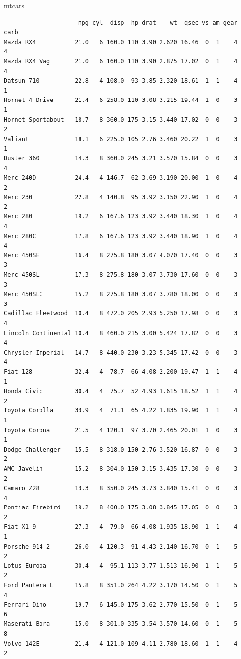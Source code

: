 \documentclass[
]{article}
\newenvironment{Shaded}{\begin{snugshade}}{\end{snugshade}}
\newcommand{\NormalTok}[1]{#1}
\begin{document}
\begin{Shaded}
\begin{Highlighting}[]
\NormalTok{mtcars}
\end{Highlighting}
\end{Shaded}

\begin{verbatim}
                     mpg cyl  disp  hp drat    wt  qsec vs am gear carb
Mazda RX4           21.0   6 160.0 110 3.90 2.620 16.46  0  1    4    4
Mazda RX4 Wag       21.0   6 160.0 110 3.90 2.875 17.02  0  1    4    4
Datsun 710          22.8   4 108.0  93 3.85 2.320 18.61  1  1    4    1
Hornet 4 Drive      21.4   6 258.0 110 3.08 3.215 19.44  1  0    3    1
Hornet Sportabout   18.7   8 360.0 175 3.15 3.440 17.02  0  0    3    2
Valiant             18.1   6 225.0 105 2.76 3.460 20.22  1  0    3    1
Duster 360          14.3   8 360.0 245 3.21 3.570 15.84  0  0    3    4
Merc 240D           24.4   4 146.7  62 3.69 3.190 20.00  1  0    4    2
Merc 230            22.8   4 140.8  95 3.92 3.150 22.90  1  0    4    2
Merc 280            19.2   6 167.6 123 3.92 3.440 18.30  1  0    4    4
Merc 280C           17.8   6 167.6 123 3.92 3.440 18.90  1  0    4    4
Merc 450SE          16.4   8 275.8 180 3.07 4.070 17.40  0  0    3    3
Merc 450SL          17.3   8 275.8 180 3.07 3.730 17.60  0  0    3    3
Merc 450SLC         15.2   8 275.8 180 3.07 3.780 18.00  0  0    3    3
Cadillac Fleetwood  10.4   8 472.0 205 2.93 5.250 17.98  0  0    3    4
Lincoln Continental 10.4   8 460.0 215 3.00 5.424 17.82  0  0    3    4
Chrysler Imperial   14.7   8 440.0 230 3.23 5.345 17.42  0  0    3    4
Fiat 128            32.4   4  78.7  66 4.08 2.200 19.47  1  1    4    1
Honda Civic         30.4   4  75.7  52 4.93 1.615 18.52  1  1    4    2
Toyota Corolla      33.9   4  71.1  65 4.22 1.835 19.90  1  1    4    1
Toyota Corona       21.5   4 120.1  97 3.70 2.465 20.01  1  0    3    1
Dodge Challenger    15.5   8 318.0 150 2.76 3.520 16.87  0  0    3    2
AMC Javelin         15.2   8 304.0 150 3.15 3.435 17.30  0  0    3    2
Camaro Z28          13.3   8 350.0 245 3.73 3.840 15.41  0  0    3    4
Pontiac Firebird    19.2   8 400.0 175 3.08 3.845 17.05  0  0    3    2
Fiat X1-9           27.3   4  79.0  66 4.08 1.935 18.90  1  1    4    1
Porsche 914-2       26.0   4 120.3  91 4.43 2.140 16.70  0  1    5    2
Lotus Europa        30.4   4  95.1 113 3.77 1.513 16.90  1  1    5    2
Ford Pantera L      15.8   8 351.0 264 4.22 3.170 14.50  0  1    5    4
Ferrari Dino        19.7   6 145.0 175 3.62 2.770 15.50  0  1    5    6
Maserati Bora       15.0   8 301.0 335 3.54 3.570 14.60  0  1    5    8
Volvo 142E          21.4   4 121.0 109 4.11 2.780 18.60  1  1    4    2
\end{verbatim}
\end{document}
